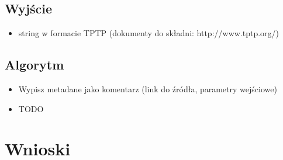\documentclass[a4paper,12pt]{article}
\begin{document}
\subsection{Wyjście}

\begin{itemize}
  \item string w formacie TPTP (dokumenty do składni: http://www.tptp.org/)
\end{itemize}

\subsection{Algorytm}
\begin{itemize}
  \item Wypisz metadane jako komentarz (link do źródła, parametry wejściowe)
  \item TODO
\end{itemize}

\section{Wnioski}
\lipsum[1]

\printglossary
\end{document}
